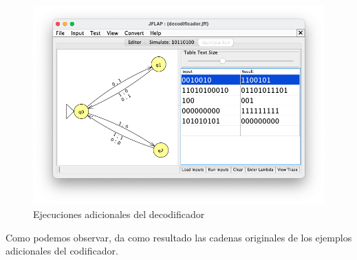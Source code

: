 \begin{figure}[H] 
	\centering
	\includegraphics[scale=0.55]{../practica_3/images/adicionales_decodificador.png} 
	\caption{Ejecuciones adicionales del decodificador} 
    \label{fig:adicionales_decodificador}
\end{figure}

Como podemos observar, da como resultado las cadenas originales de los ejemplos adicionales del codificador.


